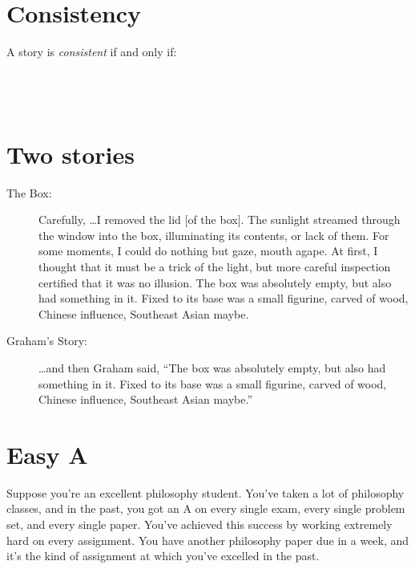 \documentclass[justified]{tufte-handout}
\begin{document}
\section{Consistency}

A story is \emph{consistent} if and only if:  \underline{\hspace{6cm}}\\\\\underline{\hspace{11.23cm}}\\\\\underline{\hspace{11.23cm}}

\section{Two stories}

\begin{description}
\item[The Box:] Carefully, \dots I removed the lid [of the box]. The sunlight streamed through the window into the box, illuminating its contents, or lack of them. For some moments, I could do nothing but gaze, mouth agape. At first, I thought that it must be a trick of the light, but more careful inspection certified that it was no illusion. The box was absolutely empty, but also had something in it. Fixed to its base was a small figurine, carved of wood, Chinese influence, Southeast Asian maybe.
\item[Graham's Story:] \dots and then Graham said, ``The box was absolutely empty, but also had something in it. Fixed to its base was  a small figurine, carved of wood, Chinese influence, Southeast Asian maybe.'' 
\end{description}

\section{Easy A}

Suppose you're an excellent philosophy student. You've taken a lot of philosophy classes, and in the past, you got an A on every single exam, every single problem set, and every single paper. You've achieved this success by working extremely hard on every assignment. You have another philosophy paper due in a week, and it's the kind of assignment at which you've excelled in the past.\\
\end{document}
